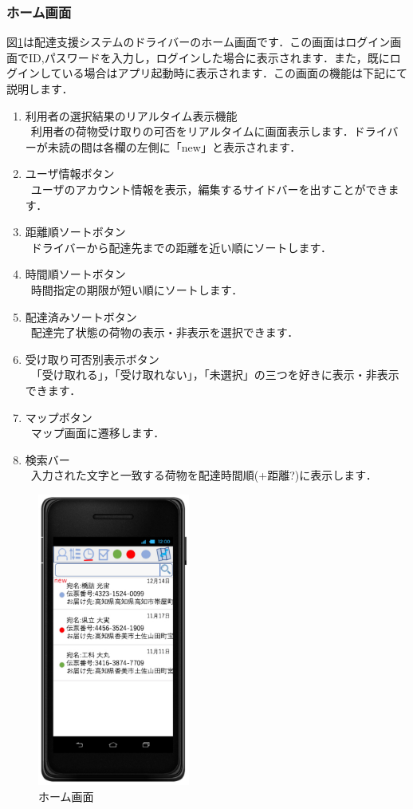 \documentclass[a4j,titlepage]{jarticle}
\begin{document}
\subsubsection{ホーム画面}
図\ref{fig:driver_home}は配達支援システムのドライバーのホーム画面です．この画面はログイン画面でID,パスワードを入力し，ログインした場合に表示されます．また，既にログインしている場合はアプリ起動時に表示されます．この画面の機能は下記にて説明します．
\begin{enumerate}
	\item 利用者の選択結果のリアルタイム表示機能\\
	 \ 利用者の荷物受け取りの可否をリアルタイムに画面表示します．ドライバーが未読の間は各欄の左側に「new」と表示されます．
	\item ユーザ情報ボタン\\
	 \ ユーザのアカウント情報を表示，編集するサイドバーを出すことができます．
	\item 距離順ソートボタン\\
	 \ ドライバーから配達先までの距離を近い順にソートします．
	\item 時間順ソートボタン\\
   \ 時間指定の期限が短い順にソートします．
	\item 配達済みソートボタン\\
   \ 配達完了状態の荷物の表示・非表示を選択できます．
	\item 受け取り可否別表示ボタン\\
	 \ 「受け取れる」，「受け取れない」，「未選択」の三つを好きに表示・非表示できます．
	\item マップボタン\\
   \ マップ画面に遷移します．
	\item 検索バー\\
	 \ 入力された文字と一致する荷物を配達時間順(+距離?)に表示します．
\end{enumerate}

\begin{figure}[htbp]
 \begin{center}
  \includegraphics[width=50mm]{driver_home.pdf}
	\caption{ホーム画面}
	\label{fig:driver_home}
 \end{center}

\end{figure}
\end{document}
